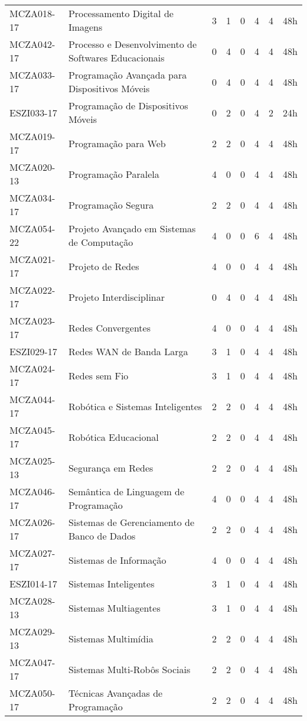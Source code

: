 \documentclass[a4paper]{article}
\begin{document}
\begin{longtable}{|l|l|llll|l|l|}
MCZA018-17 & Processamento Digital de Imagens & 3 & 1 & 0 & 4 & 4 & 48h \\
MCZA042-17 & Processo e Desenvolvimento de Softwares Educacionais & 0 & 4 & 0 & 4 & 4 & 48h \\
MCZA033-17 & Programação Avançada para Dispositivos Móveis & 0 & 4 & 0 & 4 & 4 & 48h \\
ESZI033-17 & Programação de Dispositivos Móveis & 0 & 2 & 0 & 4 & 2 & 24h \\
MCZA019-17 & Programação para Web & 2 & 2 & 0 & 4 & 4 & 48h \\
MCZA020-13 & Programação Paralela & 4 & 0 & 0 & 4 & 4 & 48h \\
MCZA034-17 & Programação Segura & 2 & 2 & 0 & 4 & 4 & 48h \\
MCZA054-22 & Projeto Avançado em Sistemas de Computação & 4 & 0 & 0 & 6 & 4 & 48h \\
MCZA021-17 & Projeto de Redes & 4 & 0 & 0 & 4 & 4 & 48h \\
MCZA022-17 & Projeto Interdisciplinar & 0 & 4 & 0 & 4 & 4 & 48h \\
MCZA023-17 & Redes Convergentes & 4 & 0 & 0 & 4 & 4 & 48h \\
ESZI029-17 & Redes WAN de Banda Larga & 3 & 1 & 0 & 4 & 4 & 48h \\
MCZA024-17 & Redes sem Fio & 3 & 1 & 0 & 4 & 4 & 48h \\
MCZA044-17 & Robótica e Sistemas Inteligentes & 2 & 2 & 0 & 4 & 4 & 48h \\
MCZA045-17 & Robótica Educacional & 2 & 2 & 0 & 4 & 4 & 48h \\
MCZA025-13 & Segurança em Redes & 2 & 2 & 0 & 4 & 4 & 48h \\
MCZA046-17 & Semântica de Linguagem de Programação & 4 & 0 & 0 & 4 & 4 & 48h \\
MCZA026-17 & Sistemas de Gerenciamento de Banco de Dados & 2 & 2 & 0 & 4 & 4 & 48h \\
MCZA027-17 & Sistemas de Informação & 4 & 0 & 0 & 4 & 4 & 48h \\
ESZI014-17 & Sistemas Inteligentes & 3 & 1 & 0 & 4 & 4 & 48h \\
MCZA028-13 & Sistemas Multiagentes & 3 & 1 & 0 & 4 & 4 & 48h \\
MCZA029-13 & Sistemas Multimídia & 2 & 2 & 0 & 4 & 4 & 48h \\
MCZA047-17 & Sistemas Multi-Robôs Sociais & 2 & 2 & 0 & 4 & 4 & 48h \\
MCZA050-17 & Técnicas Avançadas de Programação & 2 & 2 & 0 & 4 & 4 & 48h \\ 

\end{longtable}
\end{document}
